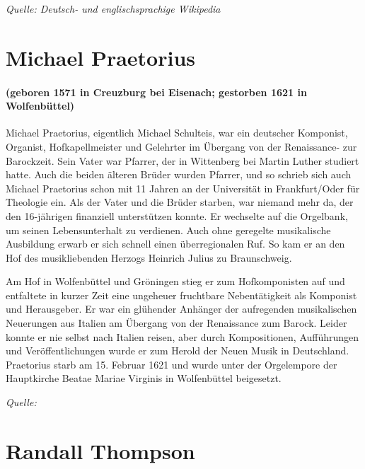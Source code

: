 \documentclass[11pt, ngermanm, titlepage]{article}
\begin{document}
\begin{multicols}{2}
	\textit{Quelle: Deutsch- und englischsprachige Wikipedia}
	
	\section*{Michael Praetorius}
	\paragraph{(geboren 1571 in Creuzburg bei Eisenach; gestorben 1621 in Wolfenbüttel)\newline}
	Michael Praetorius, eigentlich Michael Schulteis, war ein deutscher Komponist, Organist, Hofkapellmeister und Gelehrter im Übergang von der Renaissance- zur Barockzeit. Sein Vater war Pfarrer, der in Wittenberg bei Martin Luther studiert hatte. Auch die beiden älteren Brüder wurden Pfarrer, und so schrieb sich auch Michael Praetorius schon mit 11 Jahren an der Universität in Frankfurt/Oder für Theologie ein. Als der Vater und die Brüder starben, war niemand mehr da, der den 16-jährigen finanziell unterstützen konnte. Er wechselte auf die Orgelbank, um seinen Lebensunterhalt zu verdienen. Auch ohne geregelte musikalische Ausbildung erwarb er sich schnell einen überregionalen Ruf. So kam er an den Hof des musikliebenden Herzogs Heinrich Julius zu Braunschweig. 
	
	Am Hof in Wolfenbüttel und Gröningen stieg er zum Hofkomponisten auf und entfaltete in kurzer Zeit eine ungeheuer fruchtbare Nebentätigkeit als Komponist und Herausgeber. Er war ein glühender Anhänger der aufregenden musikalischen Neuerungen aus Italien am Übergang von der Renaissance zum Barock. Leider konnte er nie selbst nach Italien reisen, aber durch Kompositionen, Aufführungen und Veröffentlichungen wurde er zum Herold der Neuen Musik in Deutschland. Praetorius starb am 15. Februar 1621 und wurde unter der Orgelempore der Hauptkirche Beatae Mariae Virginis in Wolfenbüttel beigesetzt.
	
	\textit{Quelle:}
	
	\section*{Randall Thompson}

\end{multicols}
\end{document}
